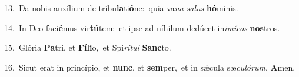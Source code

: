 {\numbfont\textcolor{\numbcolor}{13.}}~Da nobis auxílium de tribu\-\textbf{la}\-ti\-\textbf{ó}\-ne:~\star quia va\textit{na} \textit{sa}\-\textit{lus} \textbf{hó}\-minis.\par
{\numbfont\textcolor{\numbcolor}{14.}}~In Deo faci\-\textbf{é}\-mus vir\-\textbf{tú}\-tem:~\star et ipse ad níhilum dedúcet in\-\textit{i}\-\textit{mí}\textit{cos} \textbf{nos}\-tros.\par
{\numbfont\textcolor{\numbcolor}{15.}}~Glória \textbf{Pa}\-tri, et \textbf{Fí}\-\textbf{li}o,~\star et Spi\-\textit{rí}\-\textit{tu}\textit{i} \textbf{Sanc}\-to.\par
{\numbfont\textcolor{\numbcolor}{16.}}~Sicut erat in princípio, et \textbf{nunc}\-, et \textbf{sem}\-per,~\star et in sǽcula sæ\-\textit{cu}\-\textit{ló}\textit{rum}. \textbf{A}\-men.\par
